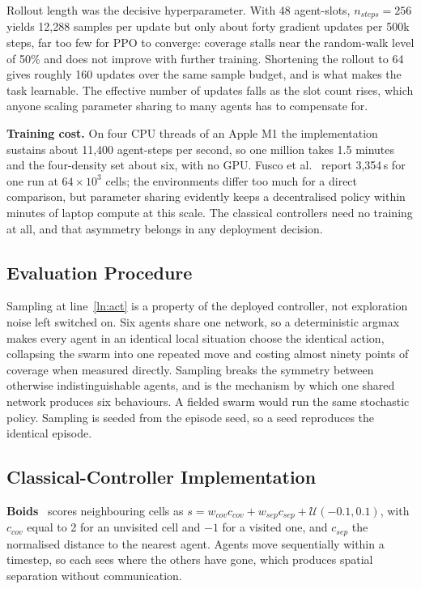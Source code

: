 \documentclass[a4paper, 10pt, conference]{ieeeconf}
\begin{document}
Rollout length was the decisive hyperparameter. With 48 agent-slots,
$n_{steps}=256$ yields 12{,}288 samples per update but only about
forty gradient updates per 500k steps, far too few for PPO to
converge: coverage stalls near the random-walk level of 50\% and does
not improve with further training. Shortening the rollout to 64 gives
roughly 160 updates over the same sample budget, and is what makes the
task learnable. The effective number of updates falls as the slot
count rises, which anyone scaling parameter sharing to many agents
has to compensate for.

\textbf{Training cost.} On four CPU threads of an Apple M1 the
implementation sustains about 11{,}400 agent-steps per second, so one
million takes 1.5 minutes and the four-density set about six, with no
GPU. Fusco et al.~\cite{fusco2025} report 3{,}354\,s for one run at
$64\times10^3$ cells; the environments differ too much for a direct
comparison, but parameter sharing evidently keeps a decentralised
policy within minutes of laptop compute at this scale. The classical
controllers need no training at all, and that asymmetry belongs in any
deployment decision.

\subsection{Evaluation Procedure}\label{sec:eval}

Sampling at line~\ref{ln:act} is a property of the deployed
controller, not exploration noise left switched on. Six agents share
one network, so a deterministic argmax makes every agent in an
identical local situation choose the identical action, collapsing the
swarm into one repeated move and costing almost ninety points of
coverage when measured directly. Sampling breaks the symmetry between
otherwise indistinguishable agents, and is the mechanism by which one
shared network produces six behaviours. A fielded swarm would run the
same stochastic policy. Sampling is seeded from the episode seed, so a
seed reproduces the identical episode.

\subsection{Classical-Controller Implementation}\label{sec:classical}

\textbf{Boids}~\cite{reynolds1987} scores neighbouring cells as
$s = w_{cov}c_{cov} + w_{sep}c_{sep} + \mathcal{U}(-0.1,0.1)$, with
$c_{cov}$ equal to 2 for an unvisited cell and $-1$ for a visited one,
and $c_{sep}$ the normalised distance to the nearest agent. Agents
move sequentially within a timestep, so each sees where the others
have gone, which produces spatial separation without communication.
\end{document}
